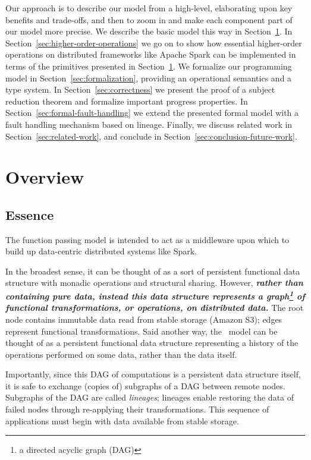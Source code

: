 \documentclass{jfp1}
\begin{document}
Our approach is to describe our model from a high-level, elaborating
upon key benefits and trade-offs, and then to zoom in and make each
component part of our model more precise. We describe the basic model
this way in Section~\ref{sec:basic-model}. In
Section~\ref{sec:higher-order-operations} we go on to show how
essential higher-order operations on distributed frameworks like
Apache Spark can be implemented in terms of the primitives presented
in Section~\ref{sec:basic-model}. We formalize our programming model
in Section~\ref{sec:formalization}, providing an operational semantics
and a type system. In Section~\ref{sec:correctness} we present the
proof of a subject reduction theorem and formalize important progress
properties. In Section~\ref{sec:formal-fault-handling} we extend the
presented formal model with a fault handling mechanism based on
lineage. Finally, we discuss related work in
Section~\ref{sec:related-work}, and conclude in
Section~\ref{sec:conclusion-future-work}.

\section{Overview}
\label{sec:basic-model}

\subsection{Essence}

The function passing model is intended to act as a 
middleware upon which to build up data-centric distributed systems like Spark. 

In the broadest sense, it can be thought of as a sort of
persistent functional data structure with monadic operations and structural
sharing. However, {\bf\em rather than containing pure data, instead this data structure
represents a graph\footnote{a directed acyclic graph (DAG)} of functional transformations,
or operations, on distributed data.} The root node contains immutable data read from stable storage 
(\eg Amazon S3); edges represent functional transformations. 
Said another way, the \FP~model can be thought of as a persistent functional 
data structure representing a history of the operations performed on some data, rather
than the data itself.

Importantly, since this DAG of computations is a persistent data structure
itself, it is safe to exchange (copies of) subgraphs of a DAG between remote
nodes. 
Subgraphs of the DAG are called \textit{lineages}; lineages enable restoring the 
data of failed nodes through re-applying their transformations. This sequence of 
applications must begin with data available from stable storage.
\end{document}
